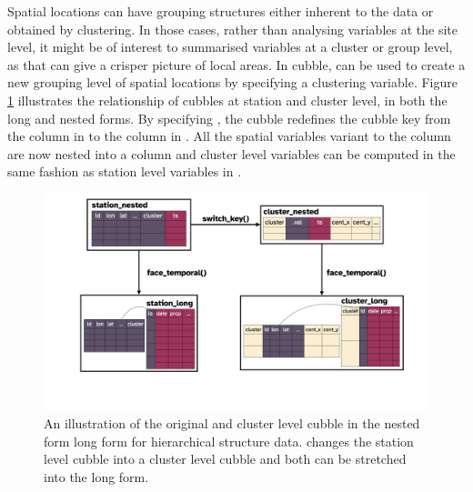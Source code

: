 \documentclass[
]{jss}
\begin{document}
Spatial locations can have grouping structures either inherent to the data or obtained by clustering. In those cases, rather than analysing variables at the site level, it might be of interest to summarised variables at a cluster or group level, as that can give a crisper picture of local areas. In cubble,  can be used to create a new grouping level of spatial locations by specifying a clustering variable. Figure \ref{fig:illu-hier} illustrates the relationship of cubbles at station and cluster level, in both the long and nested forms. By specifying , the cubble redefines the cubble key from the  column in  to the  column in . All the spatial variables variant to the  column are now nested into a  column and cluster level variables can be computed in the same fashion as station level variables in .

\begin{CodeChunk}
\begin{figure}

{\centering \includegraphics[width=1\linewidth,height=0.4\textheight]{../figures/diagram-keynotes/diagram-keynotes.003} 

}

\caption[An illustration of the original and cluster level cubble in the nested form long form for hierarchical structure data]{An illustration of the original and cluster level cubble in the nested form long form for hierarchical structure data.  changes the station level cubble into a cluster level cubble and both can be stretched into the long form.}\label{fig:illu-hier}
\end{figure}
\end{CodeChunk}
\end{document}
